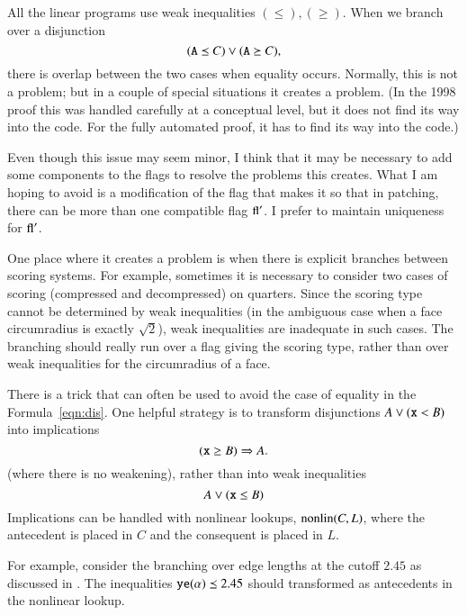 All the linear programs use weak inequalities $(\le),(\ge)$.  When
we branch over a disjunction
    \begin{equation}
    \label{eqn:dis}
    ({\operatorname{{\texttt{A}}}}\preceq C)\vee ({\operatorname{{\texttt{A}}}}\succeq C),
    \end{equation}
there is overlap between the two cases when equality occurs.
Normally, this is not a problem; but in a couple of special
situations it creates a problem.  (In the 1998 proof this was
handled carefully at a conceptual level, but it does not find its
way into the code.  For the fully automated proof, it has to find
its way into the code.)

Even though this issue may seem minor, I think that it may be
necessary to add some components to the flags to resolve the
problems this creates.  What I am hoping to avoid is a
modification of the flag that makes it so that in patching, there
can be more than one compatible flag ${\operatorname{fl}}'$.  I prefer to
maintain uniqueness for ${\operatorname{fl}}'$.

One place where it creates a problem is when there is explicit
branches between scoring systems.   For example, sometimes it is
necessary to consider two cases of scoring (compressed and 
decompressed) on quarters.  Since the scoring type cannot be
determined by weak inequalities (in the ambiguous case when a face
circumradius is exactly $\sqrt2$), weak inequalities are
inadequate in such cases.  The branching should really run over a
flag giving the scoring type, rather than over weak inequalities
for the circumradius of a face.


There is a trick that can often be used to avoid the case of
equality in the Formula~\ref{eqn:dis}.   One helpful strategy is
to transform disjunctions $A\vee ({\operatorname{{\texttt{x}}}} < B)$ into implications
    \begin{equation}
    ({\operatorname{{\texttt{x}}}} \ge B) \Rightarrow A.
    \end{equation}
(where there is no weakening), rather than into weak inequalities
    \begin{equation}
    A \vee ({\operatorname{{\texttt{x}}}}\le B)
    \end{equation}
Implications can be handled with nonlinear lookups,
${\operatorname{nonlin}}(C,L)$, where the antecedent is placed in $C$ and the
consequent is placed in $L$.

\begin{example}  For example, consider the branching over edge
lengths at the cutoff $2.45$ as discussed in \cite[Sec.25.7]{DCG}.
The inequalities ${\operatorname{{\texttt{ye}}}}(\alpha)\preceq 2.45$ should transformed
as antecedents in the nonlinear lookup.  %
\end{example}
